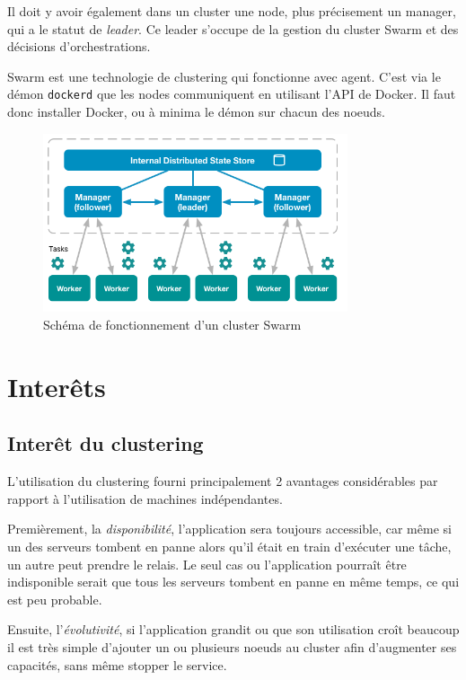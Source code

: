 Il doit y avoir également dans un cluster une node, plus précisement un manager, qui a le statut de
\emph{leader}. Ce leader s'occupe de la gestion du cluster Swarm et des décisions d'orchestrations.

Swarm est une technologie de clustering qui fonctionne avec agent. C'est via le démon
\verb:dockerd: que les nodes communiquent en utilisant l'API de Docker. Il faut donc installer
Docker, ou à minima le démon sur chacun des noeuds.

\begin{figure}[h!]
    \centering
    \includegraphics[width=0.8\textwidth]{img/swarm-network}
    \caption{Schéma de fonctionnement d'un cluster Swarm}
\end{figure}

\chapter{Interêts}

\section{Interêt du clustering}

L'utilisation du clustering fourni principalement 2 avantages considérables par rapport à
l'utilisation de machines indépendantes.\newline

Premièrement, la \emph{disponibilité}, l'application sera toujours accessible, car même si un des
serveurs tombent en panne alors qu'il était en train d'exécuter une tâche, un autre peut prendre
le relais. Le seul cas ou l'application pourraît être indisponible serait que tous les serveurs
tombent en panne en même temps, ce qui est peu probable.\newline

Ensuite, l'\emph{évolutivité}, si l'application grandit ou que son utilisation croît beaucoup
il est très simple d'ajouter un ou plusieurs noeuds au cluster afin d'augmenter ses capacités,
sans même stopper le service.

